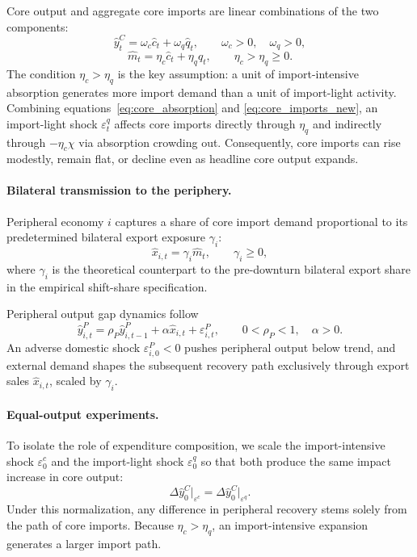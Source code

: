 \documentclass[12pt, a4paper]{article}
\begin{document}
Core output and aggregate core imports are linear combinations of the two components:
\begin{equation}
    \hat y_t^{C}
    = \omega_c \hat c_t + \omega_q \hat q_t,
    \qquad \omega_c>0,\quad \omega_q>0,
    \label{eq:core_output_new}
\end{equation}
\begin{equation}
    \hat m_t
    = \eta_c \hat c_t + \eta_q \hat q_t,
    \qquad \eta_c>\eta_q\geq0.
    \label{eq:core_imports_new}
\end{equation}
The condition $\eta_c>\eta_q$ is the key assumption: a unit of import-intensive absorption generates more import demand than a unit of import-light activity. Combining equations~\eqref{eq:core_absorption} and \eqref{eq:core_imports_new}, an import-light shock $\varepsilon_t^q$ affects core imports directly through $\eta_q$ and indirectly through $-\eta_c\chi$ via absorption crowding out. Consequently, core imports can rise modestly, remain flat, or decline even as headline core output expands.

\paragraph{Bilateral transmission to the periphery.}
Peripheral economy $i$ captures a share of core import demand proportional to its predetermined bilateral export exposure $\gamma_i$:
\begin{equation}
    \hat x_{i,t} = \gamma_i \hat m_t,
    \qquad \gamma_i\geq0,
    \label{eq:bilateral_exports}
\end{equation}
where $\gamma_i$ is the theoretical counterpart to the pre-downturn bilateral export share in the empirical shift-share specification.

Peripheral output gap dynamics follow
\begin{equation}
    \hat y_{i,t}^{P}
    = \rho_P \hat y_{i,t-1}^{P}
    + \alpha \hat x_{i,t}
    + \varepsilon_{i,t}^{P},
    \qquad 0<\rho_P<1,\quad \alpha>0.
    \label{eq:periphery_output_new}
\end{equation}
An adverse domestic shock $\varepsilon_{i,0}^{P} < 0$ pushes peripheral output below trend, and external demand shapes the subsequent recovery path exclusively through export sales $\hat x_{i,t}$, scaled by $\gamma_i$.

\paragraph{Equal-output experiments.}
To isolate the role of expenditure composition, we scale the import-intensive shock $\varepsilon_0^c$ and the import-light shock $\varepsilon_0^q$ so that both produce the same impact increase in core output:
\begin{equation}
    \Delta \hat y_0^{C}\big|_{\varepsilon^c}
    =
    \Delta \hat y_0^{C}\big|_{\varepsilon^q}.
    \label{eq:equal_output_normalization}
\end{equation}
Under this normalization, any difference in peripheral recovery stems solely from the path of core imports. Because $\eta_c>\eta_q$, an import-intensive expansion generates a larger import path.
\end{document}
